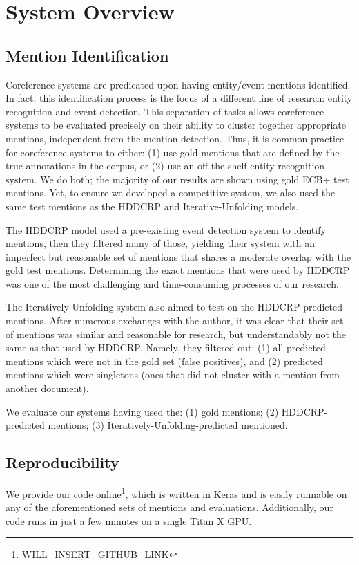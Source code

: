 \documentclass[11pt,a4paper]{article}
\begin{document}
\section{System Overview}
\subsection{Mention Identification}
\label{sec:mentionid}
Coreference systems are predicated upon having entity/event mentions identified.  In fact, this identification process is the focus of a different line of research: entity recognition and event detection.  This separation of tasks allows coreference systems to be evaluated precisely on their ability to cluster together appropriate mentions, independent from the mention detection.  Thus, it is common practice for coreference systems to either: (1) use gold mentions that are defined by the true annotations in the corpus, or (2) use an off-the-shelf entity recognition system.  We do both; the majority of our results are shown using gold ECB+ test mentions.  Yet, to ensure we developed a competitive system, we also used the same test mentions as the HDDCRP and Iterative-Unfolding models.

The HDDCRP model used a pre-existing event detection system to identify mentions, then they filtered many of those, yielding their system with an imperfect but reasonable set of mentions that shares a moderate overlap with the gold test mentions.  Determining the exact mentions that were used by HDDCRP was one of the most challenging and time-consuming processes of our research.

The Iteratively-Unfolding system also aimed to test on the HDDCRP predicted mentions.  After numerous exchanges with the author, it was clear that their set of mentions was similar and reasonable for research, but understandably not the same as that used by HDDCRP.  Namely, they filtered out: (1) all predicted mentions which were not in the gold set (false positives), and (2) predicted mentions which were singletons (ones that did not cluster with a mention from another document).

We evaluate our systems having used the: (1) gold mentions; (2) HDDCRP-predicted mentions; (3) Iteratively-Unfolding-predicted mentioned.

\subsection{Reproducibility}
We provide our code online\footnote{\url{WILL_INSERT_GITHUB_LINK}}, which is written in Keras \cite{chollet2015} and is easily runnable on any of the aforementioned sets of mentions and evaluations.  Additionally, our code runs in just a few minutes on a single Titan X GPU.
\end{document}
